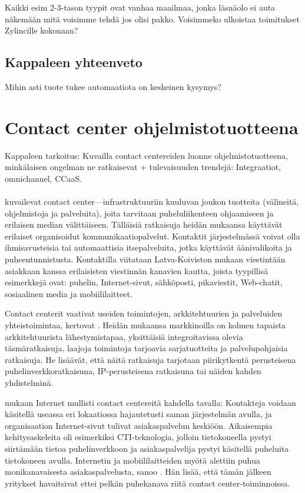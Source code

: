 \documentclass[finnish,12pt,a4paper,pdftex]{article}
\begin{document}
Kaikki esim 2-3-tason tyypit ovat vanhaa maailmaa, jonka läsnäolo ei auta näkemään mitä voisimme tehdä jos olisi pakko. Voisimmeko ulkoistaa toimitukset Zylincille kokonaan?

\subsection{Kappaleen yhteenveto}

Mihin asti tuote tukee automaatiota on keskeinen kysymys?

\section{Contact center ohjelmistotuotteena}
Kappaleen tarkoitus: Kuvailla contact centereiden luonne ohjelmistotuotteena, minkälaisen ongelman ne ratkaisevat + tulevaisuuden trendejä: Integraatiot, omnichannel, CCaaS.\\\\
\cite{ccgartner} kuvailevat contact center—infrastruktuuriin kuuluvan joukon tuotteita (välineitä, ohjelmistoja ja palveluita), joita tarvitaan puheluliikenteen ohjaamiseen ja erilaisen median välittäiseen. Tälläisiä ratkaisuja heidän mukaansa käyttävät erilaiset organisoidut kommunikaatiopalvelut. Kontaktit järjestelmässä voivat olla ihmisavusteisia tai automaattisia itsepalveluita, jotka käyttävät äänivalikoita ja puheentunnistusta. Kontaktilla viitataan Latva-Koiviston \citeyearpar{latvakoivisto} mukaan viestintään asiakkaan kanssa erilaisisten viestinnän kanavien kautta, joista tyypillisä esimerkkejä ovat: puhelin, Internet-sivut, sähköposti, pikaviestit, Web-chatit, sosiaalinen media ja mobiililaitteet.

Contact centerit vaativat useiden toimintojen, arkkitehtuurien ja palveluiden yhteistoimintaa, kertovat \cite{ccgartner}. Heidän mukaansa markkinoilla on kolmen tapaista arkkitehtuurista lähestymistapaa, yksittäisiä integroitavissa olevia täsmäratkaisuja, laajoja toimintoja tarjoavia sarjatuotteita ja palvelupohjaisia ratkaisuja. He lisäävät, että näitä ratkaisuja tarjotaan piirikytkentä perusteisena puhelinverkkoratkaisuna, IP-perusteisena ratkaisuna tai näiden kahden yhdistelminä. 

\citeauthor{bernier} mukaan Internet mullisti contact centereitä kahdella tavalla: Kontakteja voidaan käsitellä useassa eri lokaatiossa hajautetusti saman järjestelmän avulla, ja organisaation Internet-sivut tulivat asiakaspalvelun keskiöön. Aikaisempia kehitysaskeleita oli esimerkiksi CTI-teknologia, jolloin tietokoneella pystyi siirtämään tietoa puhelinverkkoon ja asiakaspalvelija pystyi käsitellä puheluita tietokoneen avulla. Internetin ja mobiililaitteiden myötä alettiin puhua monikanavaisesta asiakaspalvelusta, sanoo \citeauthor{bernier}. Hän lisää, että tämän jälkeen yritykset havaitsivat ettei pelkän puhekanava riitä contact center-toiminnoissa. 
\end{document}
